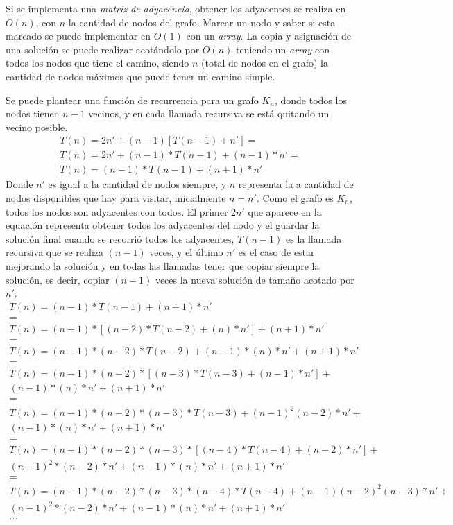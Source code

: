 Si se implementa una \emph{matriz de adyacencia}, obtener los adyacentes se realiza en $O(n)$, con $n$ la cantidad de nodos del grafo.
Marcar un nodo y saber si esta marcado se puede implementar en $O(1)$ con un \emph{array}.
La copia y asignaci\'on de una soluci\'on se puede realizar acot\'andolo por $O(n)$ teniendo un \emph{array} con todos los nodos que tiene el camino, siendo $n$ (total de nodos en el grafo) la cantidad de nodos m\'aximos que puede tener un camino simple.

Se puede plantear una funci\'on de recurrencia para un grafo $K_n$, donde todos los nodos tienen $n - 1$ vecinos, y en cada llamada recursiva se est\'a quitando un vecino posible.
\begin{equation*}
\begin{split}
T(n) = 2n' + (n-1)[T(n-1) + n'] = \\
T(n) = 2n' + (n-1)*T(n-1) + (n-1)*n' = \\
T(n) = (n-1)*T(n-1) + (n+1)*n'
\end{split}
\end{equation*}
Donde $n'$ es igual a la cantidad de nodos siempre, y $n$ representa la a cantidad de nodos disponibles que hay para visitar, inicialmente $n = n'$. Como el grafo es $K_n$, todos los nodos son adyacentes con todos.
El primer $2n'$ que aparece en la equaci\'on representa obtener todos los adyacentes del nodo y el guardar la soluci\'on final cuando se recorri\'o todos los adyacentes, $T(n-1)$ es la llamada recursiva que se realiza $(n-1)$ veces, y el \'ultimo $n'$ es el caso de estar mejorando la soluci\'on y en todas las llamadas tener que copiar siempre la soluci\'on, es decir, copiar $(n-1)$ veces la nueva soluci\'on de tama\~no acotado por $n'$.
\begin{equation*}
\begin{split}
T(n) = (n-1)*T(n-1) + (n+1)*n' \\
= \\
T(n) = (n-1)*[(n-2)*T(n-2) + (n)*n'] + (n+1)*n' \\
= \\
T(n) = (n-1)*(n-2)*T(n-2) + (n-1)*(n)*n'+ (n+1)*n' \\
= \\
T(n) = (n-1)*(n-2)*[(n-3)*T(n-3) + (n-1)*n'] + \\
(n-1)*(n)*n'+ (n+1)*n' \\
= \\
T(n) = (n-1)*(n-2)*(n-3)*T(n-3) + (n-1)^2(n-2)*n' + \\
(n-1)*(n)*n' + (n+1)*n' \\
= \\
T(n) = (n-1)*(n-2)*(n-3)*[(n-4)*T(n-4) + (n-2)*n'] + \\
(n-1)^2*(n-2)*n' + (n-1)*(n)*n' + (n+1)*n' \\
= \\
T(n) = (n-1)*(n-2)*(n-3)*(n-4)*T(n-4) + (n-1)(n-2)^2(n-3)*n' + \\
(n-1)^2*(n-2)*n' + (n-1)*(n)*n' + (n+1)*n' \\
\dots
\end{split}
\end{equation*}
